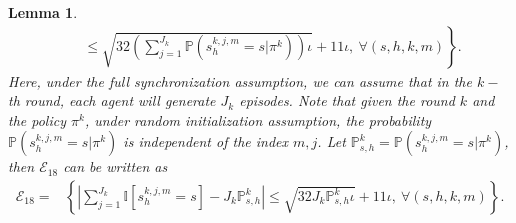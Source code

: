 \documentclass{article}
\newtheorem{lemma}{Lemma}[section]
\begin{document}
\begin{lemma}
\begin{align*}
    &\quad \left. \leq \sqrt{32\left( \sum_{j = 1}^{J_k}\mathbb{P}\left(s_{h}^{k,j,m} = s | \pi^k\right)\right)\iota} + 11\iota, \ \forall (s,h,k,m) \right\}.
\end{align*}
Here, under the full synchronization assumption, we can assume that in the $k-$th round, each agent will generate $J_k$ episodes. Note that given the round $k$ and the policy $\pi^k$, under random initialization assumption, the probability $\mathbb{P}(s_{h}^{k,j,m} = s|\pi^k)$ is independent of the index $m,j$. Let $\mathbb{P}_{s,h}^{k} = \mathbb{P}(s_{h}^{k,j,m} = s | \pi^k)$, then $\mathcal{E}_{18}$ can be written as
\begin{align*}
\mathcal{E}_{18} = &\left\{ 
    \left|\sum_{j = 1}^{J_k}\mathbb{I}\left[s_{h}^{k,j,m} = s\right] - J_k\mathbb{P}_{s,h}^{k}\right| \leq \sqrt{32J_k\mathbb{P}_{s,h}^{k}\iota} + 11\iota, \ \forall (s,h,k,m) \right\}.
\end{align*}
\end{lemma}
\end{document}
